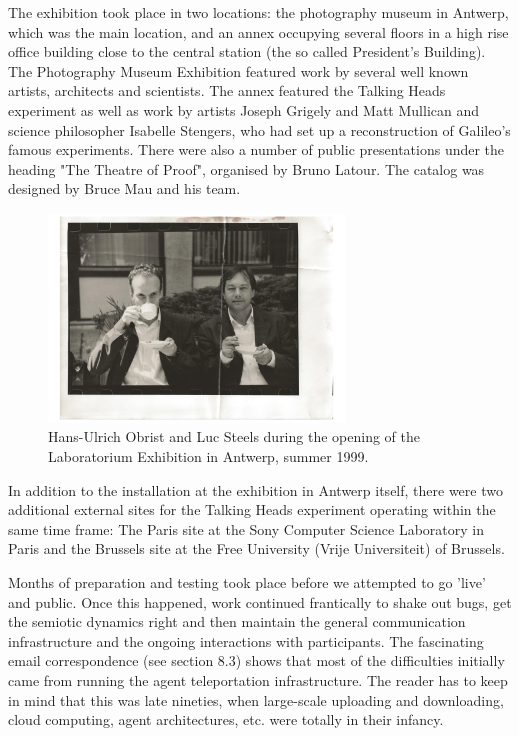 The exhibition took place in two locations: the photography museum in Antwerp, which was the main location, and an annex 
occupying several floors in a high rise office building close to the central station (the so called President's
Building). The Photography Museum Exhibition featured work by several well known artists, architects and scientists. 
The annex featured the Talking Heads experiment as well as 
work by artists Joseph Grigely and Matt Mullican and science philosopher 
Isabelle Stengers, who had set up a reconstruction of Galileo's famous experiments. 
There were also a number of public presentations under the heading 
"The Theatre of Proof", organised by Bruno Latour. The catalog was designed by Bruce Mau and his team. 
\begin{figure}[htbp]
  \centerline{\includegraphics[width=0.7\textwidth]{chap8/figures/hu-obrist+ls}}
\caption{\footnotesize \label{fig:faces} 
Hans-Ulrich Obrist and Luc Steels during the opening of the Laboratorium Exhibition in Antwerp, summer 1999. }
\end{figure}
In addition to the installation at the exhibition in Antwerp itself, there were two additional 
external sites for the Talking Heads experiment operating within the same time frame: The Paris site at the Sony Computer 
Science Laboratory in Paris and the Brussels site at the Free University (Vrije Universiteit) of Brussels.

Months of preparation and testing took place before we attempted to go 'live' and public. 
Once this happened, work continued frantically to shake out bugs, get the semiotic dynamics right
and then maintain the general communication infrastructure and the ongoing interactions with participants. 
The fascinating email correspondence (see section 8.3) shows that most of the difficulties initially came 
from running the agent teleportation infrastructure. The reader has to keep in mind that this was 
late nineties, when large-scale uploading 
and downloading, cloud computing, agent architectures, etc. were totally in their infancy. 

